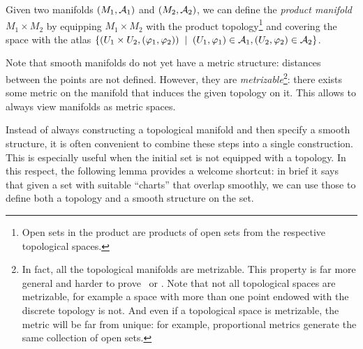 \begin{example}\label{ex:pm}
  Given two manifolds $(M_1, \mathcal{A}_1)$ and $(M_2, \mathcal{A}_2)$, we can define the \emph{product manifold} $M_1 \times M_2$ by equipping $M_1 \times M_2$ with the product topology\footnote{Open sets in the product are products of open sets from the respective topological spaces.} and covering the space with the atlas $\{ (U_1\times U_2, (\varphi_1, \varphi_2)) \;\mid\; (U_1, \varphi_1)\in\mathcal{A}_1, (U_2, \varphi_2)\in \mathcal{A}_2\}$.
\end{example}

Note that smooth manifolds do not yet have a metric structure: distances between the points are not defined.
However, they are \emph{metrizable}\footnote{In fact, all the topological manifolds are metrizable. This property is far more general and harder to prove~\cite[Theorem 34.1 and Exercise 1 of Chapter 4.36]{book:munkres:topology} or \cite{nlab:urysohn_metrization_theorem}. Note that not all topological spaces are metrizable, for example a space with more than one point endowed with the discrete topology is not. And even if a topological space is metrizable, the metric will be far from unique: for example, proportional metrics generate the same collection of open sets.}: there exists some metric on the manifold that induces the given topology on it.
This allows to always view manifolds as metric spaces.

Instead of always constructing a topological manifold and then specify a smooth structure, it is often convenient to combine these steps into a single construction.
This is especially useful when the initial set is not equipped with a topology.
In this respect, the following lemma provides a welcome shortcut: in brief it says that given a set with suitable ``charts'' that overlap smoothly, we can use those to define both a topology and a smooth structure on the set.

